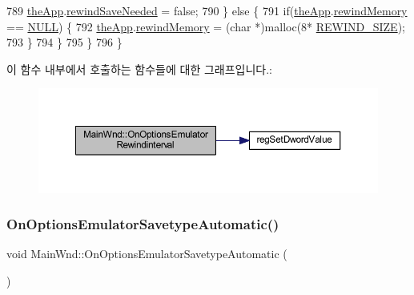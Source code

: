 \begin{DoxyCode}
789             \mbox{\hyperlink{_v_b_a_8cpp_a8095a9d06b37a7efe3723f3218ad8fb3}{theApp}}.\mbox{\hyperlink{class_v_b_a_a3f8cd6f6705f0306f57818e885a50aa3}{rewindSaveNeeded}} = \textcolor{keyword}{false};
790         \} \textcolor{keywordflow}{else} \{
791             \textcolor{keywordflow}{if}(\mbox{\hyperlink{_v_b_a_8cpp_a8095a9d06b37a7efe3723f3218ad8fb3}{theApp}}.\mbox{\hyperlink{class_v_b_a_ad2f4e21586cc185a1e6525080532471a}{rewindMemory}} == \mbox{\hyperlink{getopt1_8c_a070d2ce7b6bb7e5c05602aa8c308d0c4}{NULL}}) \{
792                 \mbox{\hyperlink{_v_b_a_8cpp_a8095a9d06b37a7efe3723f3218ad8fb3}{theApp}}.\mbox{\hyperlink{class_v_b_a_ad2f4e21586cc185a1e6525080532471a}{rewindMemory}} = (\textcolor{keywordtype}{char} *)malloc(8*
      \mbox{\hyperlink{_s_d_l_8cpp_ac23853e466152bcbd456ac1e976f4e84}{REWIND\_SIZE}});
793             \}
794         \}
795     \}
796 \}
\end{DoxyCode}
이 함수 내부에서 호출하는 함수들에 대한 그래프입니다.\+:
\nopagebreak
\begin{figure}[H]
\begin{center}
\leavevmode
\includegraphics[width=350pt]{class_main_wnd_aed243489fe737a76bfdabee4a0a1b8f8_cgraph}
\end{center}
\end{figure}
\mbox{\label{class_main_wnd_a052e23f4c24c94b273a095d36e660fdd}} 
\subsubsection{\texorpdfstring{On\+Options\+Emulator\+Savetype\+Automatic()}{OnOptionsEmulatorSavetypeAutomatic()}}
{\footnotesize\ttfamily void Main\+Wnd\+::\+On\+Options\+Emulator\+Savetype\+Automatic (\begin{DoxyParamCaption}{ }\end{DoxyParamCaption})\hspace{0.3cm}{\ttfamily [protected]}}



